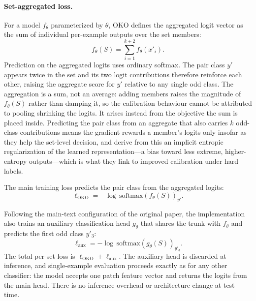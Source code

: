 \documentclass[11pt]{article}
\begin{document}
\paragraph{Set-aggregated loss.}
For a model $f_\theta$ parameterized by $\theta$, OKO defines the aggregated logit vector as the sum of individual per-example outputs over the set members:
\begin{equation}
  f_\theta(S) = \sum_{i=1}^{k+2} f_\theta(x'_i).
  \label{eq:oko-aggregate}
\end{equation}
\noindent Prediction on the aggregated logits uses ordinary softmax. The pair class $y'$ appears twice in the set and its two logit contributions therefore reinforce each other, raising the aggregate score for $y'$ relative to any single odd class. The aggregation is a sum, not an average: adding members raises the magnitude of $f_\theta(S)$ rather than damping it, so the calibration behaviour cannot be attributed to pooling shrinking the logits. It arises instead from the objective the sum is placed inside. Predicting the pair class from an aggregate that also carries $k$ odd-class contributions means the gradient rewards a member's logits only insofar as they help the set-level decision, and \citet{muttenthaler2024setLearning} derive from this an implicit entropic regularization of the learned representation---a bias toward less extreme, higher-entropy outputs---which is what they link to improved calibration under hard labels.

The main training loss predicts the pair class from the aggregated logits:
\begin{equation}
  \ell_{\mathrm{OKO}} = -\log\,\mathrm{softmax}(f_\theta(S))_{y'}.
  \label{eq:oko-hard-loss}
\end{equation}

Following the main-text configuration of the original paper, the implementation also trains an auxiliary classification head $g_\theta$ that shares the trunk with $f_\theta$ and predicts the first odd class $y'_3$:
\begin{equation}
  \ell_{\mathrm{aux}} = -\log\,\mathrm{softmax}(g_\theta(S))_{y'_3}.
  \label{eq:oko-aux-loss}
\end{equation}
\noindent The total per-set loss is $\ell_{\mathrm{OKO}}+\ell_{\mathrm{aux}}$. The auxiliary head is discarded at inference, and single-example evaluation proceeds exactly as for any other classifier: the model accepts one patch feature vector and returns the logits from the main head. There is no inference overhead or architecture change at test time.
\end{document}
